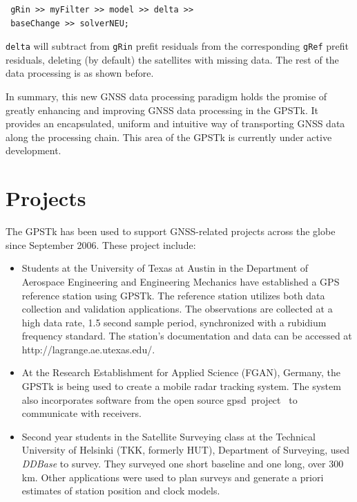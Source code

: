 \documentclass[letterpaper,ugly,10pt]{ion-gps}
\newcommand{\gpstkapp}[1]{\textit{\mbox{#1}}}
\newcommand{\gpstkclass}[1]{\texttt{\mbox{#1}}}
\begin{document}
\begin{scriptsize}
\begin{lstlisting}
 gRin >> myFilter >> model >> delta >> 
 baseChange >> solverNEU;
\end{lstlisting}
\end{scriptsize}

\gpstkclass{delta} will subtract from \gpstkclass{gRin} prefit residuals from the corresponding \gpstkclass{gRef} prefit residuals, deleting (by default) the satellites with missing data. The rest of the data processing is as shown before.

In summary, this new GNSS data processing paradigm holds the promise of greatly enhancing and improving GNSS data processing in the GPSTk. It provides an encapsulated, uniform and intuitive way of transporting GNSS data along the processing chain. This area of the GPSTk is currently under active development.


\section*{Projects}

The GPSTk has been used to support GNSS-related projects across the globe since September 2006. These project include:
\begin{itemize}
\item  Students at the University of Texas at Austin in the Department of Aerospace Engineering and Engineering Mechanics have established a GPS reference station using GPSTk. The reference station utilizes both data collection and validation applications. The observations are collected at a high data rate, 1.5 second sample period, synchronized with a rubidium frequency standard. The station's documentation and data can be accessed at http://lagrange.ae.utexas.edu/.
\item At the Research Establishment for Applied Science (FGAN), Germany, the GPSTk is being used to create a mobile radar tracking system. The system also incorporates software from the open source \mbox{gpsd project \cite{gpsd}} to communicate with receivers.
\item Second year students in the Satellite Surveying class at the Technical University of Helsinki (TKK, formerly HUT), Department of Surveying, used \gpstkapp{DDBase} to survey. They surveyed one short baseline and one long, over 300 km. Other applications were used to plan surveys and generate a priori estimates of station position and clock models.
\end{itemize}
\end{document}
